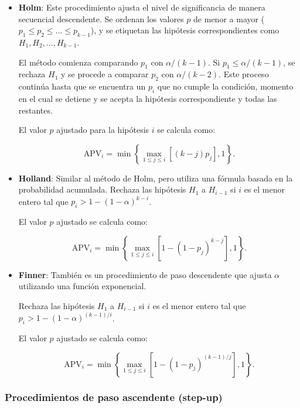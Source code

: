 \begin{itemize}
    \item \textbf{Holm}: Este procedimiento ajusta el nivel de significancia de manera secuencial descendente. Se ordenan los valores $p$ de menor a mayor ($p_1 \leq p_2 \leq \dots \leq p_{k-1}$), y se etiquetan las hipótesis correspondientes como $H_1, H_2, \dots, H_{k-1}$.

    El método comienza comparando $p_1$ con $\alpha / (k - 1)$. Si $p_1 \leq \alpha / (k - 1)$, se rechaza $H_1$ y se procede a comparar $p_2$ con $\alpha / (k - 2)$. Este proceso continúa hasta que se encuentra un $p_i$ que no cumple la condición, momento en el cual se detiene y se acepta la hipótesis correspondiente y todas las restantes.

    El valor $p$ ajustado para la hipótesis $i$ se calcula como:

    \[
    \text{APV}_i = \min\left\{\max_{1 \leq j \leq i} [(k - j) p_j], 1\right\}.
    \]

    \item \textbf{Holland}: Similar al método de Holm, pero utiliza una fórmula basada en la probabilidad acumulada. Rechaza las hipótesis $H_1$ a $H_{i-1}$ si $i$ es el menor entero tal que $p_i > 1 - (1 - \alpha)^{k - i}$.

    El valor $p$ ajustado se calcula como:

    \[
    \text{APV}_i = \min\left\{\max_{1 \leq j \leq i} [1 - (1 - p_j)^{k - j}], 1\right\}.
    \]

    \item \textbf{Finner}: También es un procedimiento de paso descendente que ajusta $\alpha$ utilizando una función exponencial.

    Rechaza las hipótesis $H_1$ a $H_{i-1}$ si $i$ es el menor entero tal que $p_i > 1 - (1 - \alpha)^{(k - 1)/i}$.

    El valor $p$ ajustado se calcula como:

    \[
    \text{APV}_i = \min\left\{\max_{1 \leq j \leq i} \left[1 - (1 - p_j)^{(k - 1)/j}\right], 1\right\}.
    \]
\end{itemize}

\subsubsection{Procedimientos de paso ascendente (step-up)}

